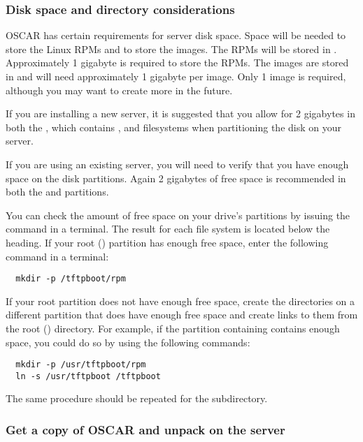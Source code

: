 \subsubsection{Disk space and directory considerations}
\label{det:serverdiskpar}

OSCAR has certain requirements for server disk space. Space will be
needed to store the Linux RPMs and to store the images.  The RPMs will
be stored in . Approximately 1 gigabyte is
required to store the RPMs.  The images are stored in
 and will need approximately 1 gigabyte
per image. Only 1 image is required, although you may want to create
more in the future.

If you are installing a new server, it is suggested that you allow for 
2 gigabytes in both the \file{/}, which contains ,  
and  filesystems when partitioning the disk on your server.

If you are using an existing server, you will need to verify that you have 
enough space on the disk partitions. Again 2 gigabytes of free space
is recommended in both the \file{/} and  partitions.

You can check
the amount of free space on your drive's partitions by issuing the
command  in a terminal.  The result for each file system is
located below the  heading. If your root (\file{/})
partition has enough free space, enter the following command in a
terminal:

\begin{verbatim}
  mkdir -p /tftpboot/rpm
\end{verbatim}
  
If your root partition does not have enough free space, create the
directories on a different partition that does have enough free space
and create links to them from the root (\file{/}) directory.  For
example, if the partition containing  contains enough
space, you could do so by using the following commands:

\begin{verbatim}
  mkdir -p /usr/tftpboot/rpm
  ln -s /usr/tftpboot /tftpboot
\end{verbatim}

The same procedure should be repeated for the 
subdirectory.

    
\subsubsection{Get a copy of OSCAR and unpack on the server} 
\label{det:unpack}

